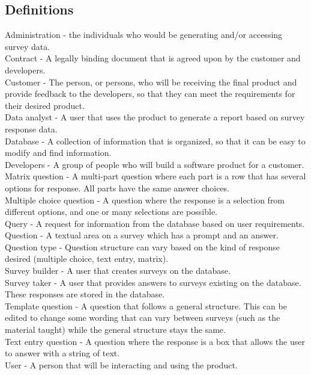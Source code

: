 \subsection{Definitions}
\noindent Administration - the individuals who would be generating and/or accessing survey data. \\
Contract - A legally binding document that is agreed upon by the customer and developers.  \\
Customer - The person, or persons, who will be receiving the final product and provide feedback to the developers, so that they can meet the requirements for their desired product. \\
Data analyst - A user that uses the product to generate a report based on survey response data. \\
Database - A collection of information that is organized, so that it can be easy to modify and find information. \\
Developers - A group of people who will build a software product for a customer. \\
Matrix question - A multi-part question where each part is a row that has several options for response. All parts have the
same answer choices.\\
Multiple choice question - A question where the response is a selection from different options, and one or many selections
are possible.\\
Query - A request for information from the database based on user requirements.\\
Question - A textual area on a survey which has a prompt and an answer.\\
Question type - Question structure can vary based on the kind of response desired (multiple choice, text entry, matrix). \\
Survey builder - A user that creates surveys on the database.\\
Survey taker - A user that provides answers to surveys existing on the database. These responses are stored in
the database.\\
Template question - A question that follows a general structure. This can be edited to change some wording that can
vary between surveys (such as the material taught) while the general structure stays the same.\\
Text entry question - A question where the response is a box that allows the user to answer with a string of text.\\
User - A person that will be interacting and using the product.


